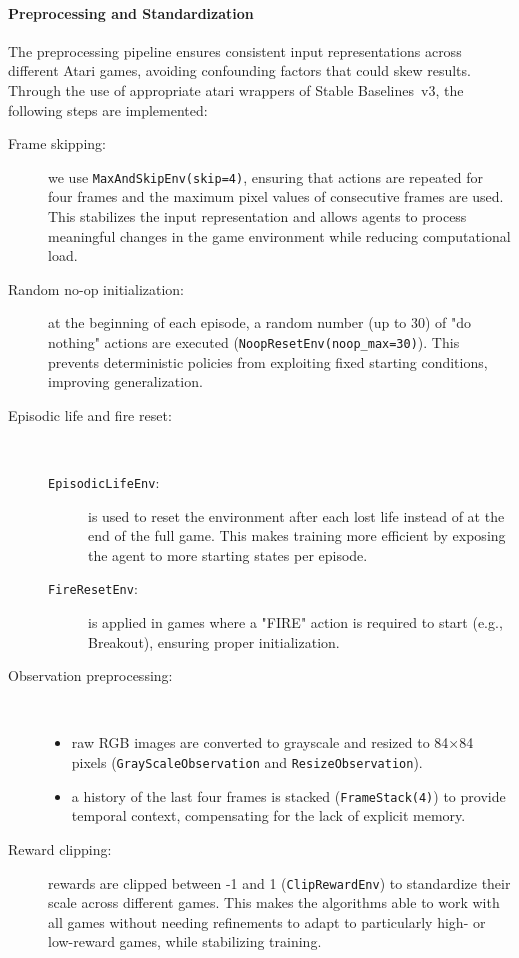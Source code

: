 \paragraph{Preprocessing and Standardization}
The preprocessing pipeline ensures consistent input representations across different Atari games, avoiding confounding factors that could skew results. Through the use of appropriate atari wrappers of Stable Baselines~v3, the following steps are implemented:
\begin{description}
	\item[Frame skipping:] we use \verb|MaxAndSkipEnv(skip=4)|, ensuring that actions are repeated for four frames and the maximum pixel values of consecutive frames are used. This stabilizes the input representation and allows agents to process meaningful changes in the game environment while reducing computational load.
	\item[Random no-op initialization:] at the beginning of each episode, a random number (up to 30) of "do nothing" actions are executed (\verb|NoopResetEnv(noop_max=30)|). This prevents deterministic policies from exploiting fixed starting conditions, improving generalization.
	\item[Episodic life and fire reset:]\
	\begin{description}
		\item[\texttt{EpisodicLifeEnv}:] is used to reset the environment after each lost life instead of at the end of the full game. This makes training more efficient by exposing the agent to more starting states per episode.
		\item[\texttt{FireResetEnv}:] is applied in games where a "FIRE" action is required to start (e.g., Breakout), ensuring proper initialization.
	\end{description}
	\item[Observation preprocessing:]\
	\begin{itemize}
		\item raw RGB images are converted to grayscale and resized to 84×84 pixels (\verb|GrayScaleObservation| and \verb|ResizeObservation|).
		\item a history of the last four frames is stacked (\verb|FrameStack(4)|) to provide temporal context, compensating for the lack of explicit memory.
	\end{itemize}
	\item[Reward clipping:] rewards are clipped between -1 and 1 (\verb|ClipRewardEnv|) to standardize their scale across different games. This makes the algorithms able to work with all games without needing refinements to adapt to particularly high- or low-reward games, while stabilizing training.
\end{description}

